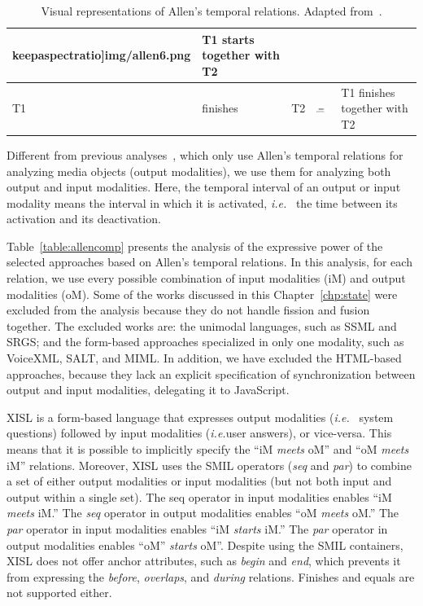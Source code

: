 \documentclass[
  doutorado,
  american
]{ThesisPUC}
\newcommand{\tab}[1]{Table~\ref{#1}}
\newcommand{\chp}[1]{Chapter~\ref{#1}}
\begin{document}
\begin{table}[b]
\begin{tabular}{ l l l m{3cm} m{7cm} }
	keepaspectratio]{img/allen6.png} & T1 starts together with T2 \\
	\hline
	T1 &	finishes &	T2 &	\includegraphics[width=1.5cm, 
	keepaspectratio]{img/allen7.png} & T1 finishes together with T2 \\
	\hline
\end{tabular}
\caption[Visual representations of Allen’s temporal relations.]{Visual 
representations of Allen’s temporal relations. Adapted 
from~\cite{allen_maintaining_1983}.}
\label{table:allen}
\end{table}

Different from previous analyses~\cite{huang_synchronization_1998}, which only
use Allen’s temporal relations for analyzing media objects (output modalities),
we use them for analyzing both output and input modalities. Here, the temporal
interval of an output or input modality means the interval in which it is
activated, \textit{i.e.}~ the time between its activation and its deactivation. 

\tab{table:allencomp} presents the analysis of the expressive power of the
selected approaches based on Allen’s temporal relations. In this analysis, for
each relation, we use every possible combination of input modalities (iM) and
output modalities (oM). Some of the works discussed in this \chp{chp:state} were 
excluded from the analysis because they do not handle fission and fusion 
together. The
excluded works are: the unimodal languages, such as SSML and SRGS; and the
form-based approaches specialized in only one modality, such as VoiceXML, SALT,
and MIML. In addition, we have excluded the HTML-based approaches, because they
lack an explicit specification of synchronization between output and input
modalities, delegating it to JavaScript.

XISL is a form-based language that expresses output modalities (\textit{i.e.}~ system
questions) followed by input modalities (\textit{i.e.}user answers), or 
vice-versa. This
means that it is possible to implicitly specify the “iM \textit{meets} oM” and
“oM \textit{meets} iM” relations. Moreover, XISL uses the SMIL operators
(\textit{seq} and 
\textit{par}) to combine a set of either output modalities or input modalities
(but not both input and output within a single set). The seq operator in input
modalities enables “iM \textit{meets} iM.” The \textit{seq} operator in output
modalities enables “oM \textit{meets} oM.” The \textit{par} operator in input
modalities enables “iM \textit{starts} iM.” The 
\textit{par} operator in output modalities enables “oM” \textit{starts} oM”.
Despite using the SMIL containers, XISL does not offer anchor attributes, such
as \textit{begin} and 
\textit{end}, which prevents it from expressing the \textit{before},
\textit{overlaps}, and 
\textit{during} relations. Finishes and equals are not supported either.
\end{document}
